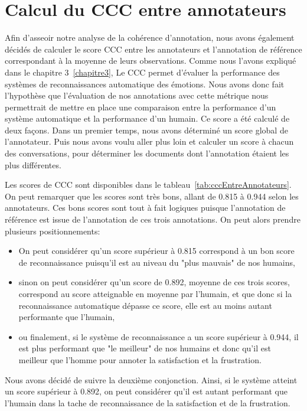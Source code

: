 \section{Calcul du CCC entre annotateurs}
Afin d'asseoir notre analyse de la cohérence d'annotation, nous avons également décidés de calculer le score CCC entre les annotateurs et l'annotation de référence correspondant à la moyenne de leurs observations.
Comme nous l'avons expliqué dans le chapitre 3~\ref{chapitre3}, Le CCC permet d'évaluer la performance des systèmes de reconnaissances automatique des émotions. Nous avons donc fait l'hypothèse que l'évaluation de nos annotations avec cette métrique nous permettrait de mettre en place une comparaison entre la performance d'un système automatique et la performance d'un humain.
Ce score a été calculé de deux façons. Dans un premier temps, nous avons déterminé un score global de l'annotateur. Puis nous avons voulu aller plus loin et calculer un score à chacun des conversations, pour déterminer les documents dont l'annotation étaient les plus différentes.


Les scores de CCC sont disponibles dans le tableau~\ref{tab:cccEntreAnnotateurs}. On peut remarquer que les scores sont très bons, allant de 0.815 à 0.944 selon les annotateurs. Ces bons scores sont tout à fait logiques puisque l'annotation de référence est issue de l'annotation de ces trois annotations. On peut alors prendre plusieurs positionnements:
\begin{itemize}
  \item On peut considérer qu'un score supérieur à 0.815 correspond à un bon score de reconnaissance puisqu'il est au niveau du "plus mauvais" de nos humains,
  \item sinon on peut considérer qu'un score de 0.892, moyenne de ces trois scores, correspond au score atteignable en moyenne par l'humain, et que donc si la reconnaissance automatique dépasse ce score, elle est au moins autant performante que l'humain,
  \item ou finalement, si le système de reconnaissance a un score supérieur à 0.944, il est plus performant que "le meilleur" de nos humains et donc qu'il est meilleur que l'homme pour annoter la satisfaction et la frustration.
\end{itemize}

Nous avons décidé de suivre la deuxième conjonction. Ainsi, si le système atteint un score supérieur à 0.892, on peut considérer qu'il est autant performant que l'humain dans la tache de reconnaissance de la satisfaction et de la frustration.

